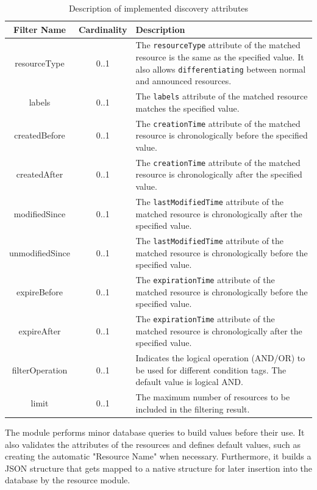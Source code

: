 \documentclass[a4paper,fleqn]{cas-dc}
\begin{document}
\begin{table}[ht]
\scriptsize
\centering
\caption{Description of implemented discovery attributes}
\label{tab:discovery_attributes}
\begin{tabular}{c c p{4cm}}
\hline
\textbf{Filter Name} & \textbf{Cardinality} & \textbf{Description} \\
\hline \hline
resourceType & 0..1 & The \texttt{resourceType} attribute of the matched resource is the same as the specified value. It also allows \texttt{differentiating} between normal and announced resources. \\
labels & 0..1 & The \texttt{labels} attribute of the matched resource matches the specified value. \\
createdBefore & 0..1 & The \texttt{creationTime} attribute of the matched resource is chronologically before the specified value. \\
createdAfter & 0..1 & The \texttt{creationTime} attribute of the matched resource is chronologically after the specified value. \\
modifiedSince & 0..1 & The \texttt{lastModifiedTime} attribute of the matched resource is chronologically after the specified value. \\
unmodifiedSince & 0..1 & The \texttt{lastModifiedTime} attribute of the matched resource is chronologically before the specified value. \\
expireBefore & 0..1 & The \texttt{expirationTime} attribute of the matched resource is chronologically before the specified value. \\
expireAfter & 0..1 & The \texttt{expirationTime} attribute of the matched resource is chronologically after the specified value. \\
filterOperation & 0..1 & Indicates the logical operation (AND/OR) to be used for different condition tags. The default value is logical AND. \\
limit & 0..1 & The maximum number of resources to be included in the filtering result. \\
\hline
\end{tabular}
\end{table}

The module performs minor database queries to build values before their use. It also validates the attributes of the resources and defines default values, such as creating the automatic "Resource Name" when necessary. Furthermore, it builds a JSON structure that gets mapped to a native structure for later insertion into the database by the resource module.
\end{document}
